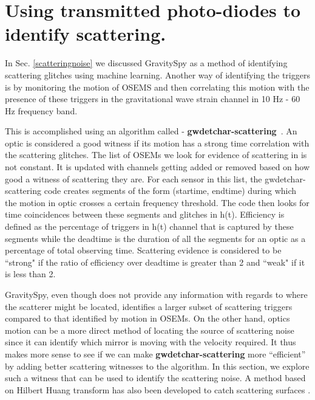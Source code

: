 \documentclass[12pt]{iopart}
\begin{document}

 

\section{Using transmitted photo-diodes to identify scattering.}\label{transmonwitness}
In Sec. \ref{scatteringnoise} we discussed GravitySpy as a method of identifying scattering glitches using machine learning.
Another way of identifying the triggers is by monitoring the motion of OSEMS and then correlating this motion with the presence of these triggers in the gravitational wave strain channel in 10 Hz - 60 Hz frequency band.

This is accomplished using an algorithm called - \textbf{gwdetchar-scattering}~\cite{alex_l_urban_2019_3526829}. An optic is considered a good witness if its motion has a strong time correlation with the scattering glitches. The list of OSEMs we look for evidence of scattering in is not constant. It is updated with channels getting added or removed based on how good a witness of scattering they are. For each sensor in this list, the gwdetchar-scattering code creates segments of the form (startime, endtime) during which the motion in optic crosses a certain frequency threshold.  The code then looks for time coincidences between these segments and glitches in h(t). Efficiency is defined as the percentage of triggers in h(t) channel that is captured by these segments while the deadtime is the duration of all the segments for an optic as a percentage of total observing time. Scattering evidence is considered to be ``strong" if the ratio of efficiency over deadtime is greater than 2 and ``weak" if it is less than 2. 


GravitySpy, even though does not provide any information with regards to where the scatterer might be located, identifies a larger subset of scattering triggers compared to that identified by motion in OSEMs. On the other hand, optics motion can be a more direct method of locating the source of scattering noise since it can identify which mirror is moving with the velocity required. It thus makes more sense to see if we can make \textbf{gwdetchar-scattering} more ``efficient'' by adding better scattering witnesses to the algorithm. In this section, we explore such a witness that can be used to identify the scattering noise. A method based on Hilbert Huang transform has also been developed to catch scattering surfaces \cite{hhtransform}.
\end{document}
